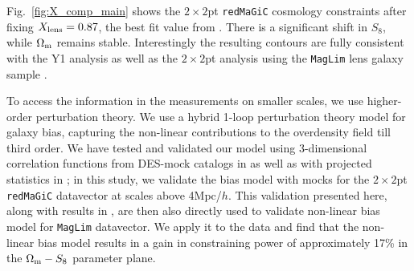\documentclass[aps, prd,twocolumn,superscriptaddress,nofootinbib,preprintnumbers]{revtex4-1}
\newcommand{\redmagic}{\texttt{redMaGiC} }
\newcommand{\maglim}{\texttt{MagLim} }
\newcommand{\IR}[1]{{\color{red}[\textbf{Note for IR}: #1]}}
\begin{document}


Fig.~\ref{fig:X_comp_main} shows the $2\times2$pt \redmagic cosmology constraints after fixing $X_{\rm lens}=0.87$, the best fit value from \citet{y3-3x2ptkp}. There is a significant shift in $S_8$, while $\Omega_{\rm m}$ remains stable. Interestingly the resulting contours are fully consistent with the Y1 analysis as well as the $2\times2$pt analysis using the \maglim lens galaxy sample \citep{y3-2x2ptaltlensresults}. 

To access the information in the measurements on smaller scales, we use higher-order perturbation theory. We use a hybrid 1-loop perturbation theory model for galaxy bias, capturing the non-linear contributions to the overdensity field till third order. We have tested and validated our model using 3-dimensional correlation functions from DES-mock catalogs in \citet{p2020perturbation} as well as with projected statistics in \citet*{y3-simvalidation}; in this study, we validate the bias model with mocks for the $2\times2$pt \redmagic datavector at scales above 4Mpc/$h$. This validation presented here, along with results in \citet{p2020perturbation}, are then also directly used to validate non-linear bias model for \maglim datavector.  We apply it to the data and find that the non-linear bias model results in a gain in constraining power of approximately 17\% in the $\Omega_{\rm m} - S_8$ parameter plane. 
\end{document}

